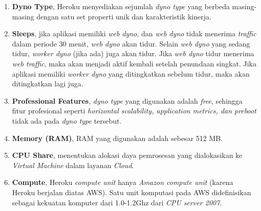 			\begin{enumerate}
				\item \textbf{Dyno Type}, Heroku menyediakan sejumlah \textit{dyno type} yang berbeda masing-masing dengan satu set properti unik dan karakteristik kinerja.
				\item \textbf{Sleeps}, jika aplikasi memiliki \textit{web dyno}, dan \textit{web dyno} tidak menerima \textit{traffic} dalam periode 30 menit, \textit{web dyno} akan tidur. Selain \textit{web dyno} yang sedang tidur, \textit{worker dyno} (jika ada) juga akan tidur. Jika \textit{web dyno} tidur menerima \textit{web traffic}, maka akan menjadi aktif kembali setelah penundaan singkat. Jika aplikasi memiliki \textit{worker dyno} yang ditingkatkan sebelum tidur, maka akan ditingkatkan lagi juga.  
				\item \textbf{Professional Features}, \textit{dyno type} yang digunakan adalah \textit{free}, sehingga fitur profesional seperti \textit{horizontal scalability, application metrics, dan preboot} tidak ada pada \textit{dyno type} tersebut.
				\item \textbf{Memory (RAM)}, RAM yang digunakan adalah sebesar 512 MB.
				\item \textbf{CPU Share}, menentukan alokasi daya pemrosesan yang dialokasikan ke \textit{Virtual Machine} dalam layanan \textit{Cloud}.
				\item \textbf{Compute}, Heroku \textit{compute unit} hanya \textit{Amazon compute unit} (karena Heroku berjalan diatas AWS). Satu unit komputasi pada AWS didefinisikan sebagai kekuatan komputer dari 1.0-1.2Ghz dari \textit{CPU server 2007}.
			\end{enumerate}
			
